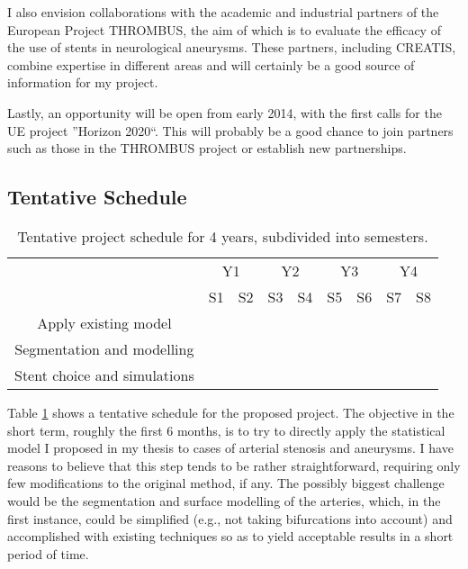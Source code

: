 \documentclass[a4paper]{article}
\begin{document}
I also envision collaborations with the academic and industrial partners of the European Project THROMBUS, the aim of which is to evaluate the efficacy of the use of stents in neurological aneurysms. These partners, including CREATIS, combine expertise in different areas and will certainly be a good source of information for my project.

Lastly, an opportunity will be open from early 2014, with the first calls for the UE project ''Horizon 2020``. This will probably be a good chance to join partners such as those in the THROMBUS project or establish new partnerships. 

\subsection{Tentative Schedule}

\begin{table}[h]\centering
\begin{tabular}{c|c|c|c|c|c|c|c|c|}
\cline{2-9}
 & \multicolumn{2}{|c|}{Y1} & \multicolumn{2}{|c|}{Y2} & \multicolumn{2}{|c|}{Y3} & \multicolumn{2}{|c|}{Y4} \\ \cline{2-9}
 & S1 & S2 & S3 & S4 & S5 & S6 & S7 & S8  \\ \hline
\multicolumn{1}{|c|}{Apply existing model} & \cellcolor{green} & & & & & & & \\ \hline
\multicolumn{1}{|c|}{Segmentation and modelling} & & \cellcolor{green} & \cellcolor{green} & \cellcolor{green} & & & & \\ \hline
\multicolumn{1}{|c|}{Stent choice and simulations} & & & & & \cellcolor{green} & \cellcolor{green} & \cellcolor{green} & \cellcolor{green} \\ \hline
\end{tabular}
\caption{Tentative project schedule for 4 years, subdivided into semesters.}
\label{tab:schedule}
\end{table}

Table \ref{tab:schedule} shows a tentative schedule for the proposed project. The objective in the short term, roughly the first 6 months, is to try to directly apply the statistical model I proposed in my thesis to cases of arterial stenosis and aneurysms. I have reasons to believe that this step tends to be rather straightforward, requiring only few modifications to the original method, if any. The possibly biggest challenge would be the segmentation and surface modelling of the arteries, which, in the first instance, could be simplified (e.g., not taking bifurcations into account) and accomplished with existing techniques so as to yield acceptable results in a short period of time. 
\end{document}
